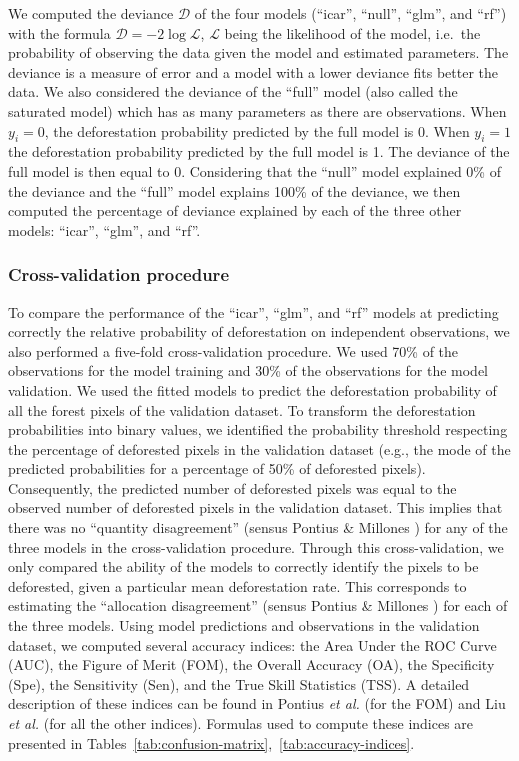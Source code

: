 \documentclass[
  12pt,
]{article}
\begin{document}
We computed the deviance \(\mathcal{D}\) of the four models (``icar'', ``null'', ``glm'', and ``rf'') with the formula \(\mathcal{D}=-2 \log \mathcal{L}\), \(\mathcal{L}\) being the likelihood of the model, i.e.~the probability of observing the data given the model and estimated parameters. The deviance is a measure of error and a model with a lower deviance fits better the data. We also considered the deviance of the ``full'' model (also called the saturated model) which has as many parameters as there are observations. When \(y_i=0\), the deforestation probability predicted by the full model is 0. When \(y_i=1\) the deforestation probability predicted by the full model is 1. The deviance of the full model is then equal to 0. Considering that the ``null'' model explained 0\% of the deviance and the ``full'' model explains 100\% of the deviance, we then computed the percentage of deviance explained by each of the three other models: ``icar'', ``glm'', and ``rf''.

\hypertarget{cross-validation-procedure}{%
\subsubsection{Cross-validation procedure}\label{cross-validation-procedure}}

To compare the performance of the ``icar'', ``glm'', and ``rf'' models at predicting correctly the relative probability of deforestation on independent observations, we also performed a five-fold cross-validation procedure. We used 70\% of the observations for the model training and 30\% of the observations for the model validation. We used the fitted models to predict the deforestation probability of all the forest pixels of the validation dataset. To transform the deforestation probabilities into binary values, we identified the probability threshold respecting the percentage of deforested pixels in the validation dataset (e.g., the mode of the predicted probabilities for a percentage of 50\% of deforested pixels). Consequently, the predicted number of deforested pixels was equal to the observed number of deforested pixels in the validation dataset. This implies that there was no ``quantity disagreement'' (sensus Pontius \& Millones \citep{Pontius2011}) for any of the three models in the cross-validation procedure. Through this cross-validation, we only compared the ability of the models to correctly identify the pixels to be deforested, given a particular mean deforestation rate. This corresponds to estimating the ``allocation disagreement'' (sensus Pontius \& Millones \citep{Pontius2011}) for each of the three models. Using model predictions and observations in the validation dataset, we computed several accuracy indices: the Area Under the ROC Curve (AUC), the Figure of Merit (FOM), the Overall Accuracy (OA), the Specificity (Spe), the Sensitivity (Sen), and the True Skill Statistics (TSS). A detailed description of these indices can be found in Pontius \emph{et al.} \citep{Pontius2008} (for the FOM) and Liu \emph{et al.} \citep{Liu2011} (for all the other indices). Formulas used to compute these indices are presented in Tables~\ref{tab:confusion-matrix},~\ref{tab:accuracy-indices}.
\end{document}
